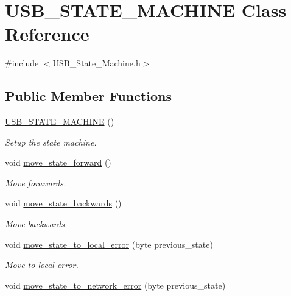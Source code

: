 \hypertarget{class_u_s_b___s_t_a_t_e___m_a_c_h_i_n_e}{\section{U\-S\-B\-\_\-\-S\-T\-A\-T\-E\-\_\-\-M\-A\-C\-H\-I\-N\-E Class Reference}
\label{class_u_s_b___s_t_a_t_e___m_a_c_h_i_n_e}
}


{\ttfamily \#include $<$U\-S\-B\-\_\-\-State\-\_\-\-Machine.\-h$>$}

\subsection*{Public Member Functions}
\begin{DoxyCompactItemize}
\item 
\hyperlink{class_u_s_b___s_t_a_t_e___m_a_c_h_i_n_e_a30b319da31639b54c875a23733d058cd}{U\-S\-B\-\_\-\-S\-T\-A\-T\-E\-\_\-\-M\-A\-C\-H\-I\-N\-E} ()
\begin{DoxyCompactList}\small\item\em Setup the state machine. \end{DoxyCompactList}\item 
void \hyperlink{class_u_s_b___s_t_a_t_e___m_a_c_h_i_n_e_a9267d4c726f31a30af67c2650388731b}{move\-\_\-state\-\_\-forward} ()
\begin{DoxyCompactList}\small\item\em Move forawards. \end{DoxyCompactList}\item 
void \hyperlink{class_u_s_b___s_t_a_t_e___m_a_c_h_i_n_e_abd067afb9ebaebc1ca4334ac75646c00}{move\-\_\-state\-\_\-backwards} ()
\begin{DoxyCompactList}\small\item\em Move backwards. \end{DoxyCompactList}\item 
void \hyperlink{class_u_s_b___s_t_a_t_e___m_a_c_h_i_n_e_a9aaa0c89397068910213985d50461459}{move\-\_\-state\-\_\-to\-\_\-local\-\_\-error} (byte previous\-\_\-state)
\begin{DoxyCompactList}\small\item\em Move to local error. \end{DoxyCompactList}\item 
void \hyperlink{class_u_s_b___s_t_a_t_e___m_a_c_h_i_n_e_a6d68989eea685cadcdb0cc43ad4fbf91}{move\-\_\-state\-\_\-to\-\_\-network\-\_\-error} (byte previous\-\_\-state)

\end{DoxyCompactItemize}

